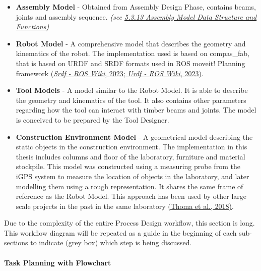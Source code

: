 \documentclass[11pt]{book}
\begin{document}
\begin{itemize}
	\item \textbf{Assembly Model} - Obtained from Assembly Design Phase, contains beams, joints and assembly sequence. \textit{\textcolor[HTML]{B7B7B7}{(see \uline{5.3.13 Assembly Model Data Structure and Functions})}}

	\item \textbf{Robot Model} - A comprehensive model that describes the geometry and kinematics of the robot. The implementation used is based on compas\_fab, that is based on URDF and SRDF formats used in ROS moveit! Planning framework \href{https://www.zotero.org/google-docs/?9FxuyJ}{(}\href{https://www.zotero.org/google-docs/?9FxuyJ}{\textit{Srdf - ROS Wiki}\href{https://www.zotero.org/google-docs/?9FxuyJ}{}, 2023; }\href{https://www.zotero.org/google-docs/?9FxuyJ}{\textit{Urdf - ROS Wiki}\href{https://www.zotero.org/google-docs/?9FxuyJ}{}, 2023)}.

	\item \textbf{Tool Models }- A model similar to the Robot Model. It is able to describe the geometry and kinematics of the tool. It also contains other parameters regarding how the tool can interact with timber beams and joints. The model is conceived to be prepared by the Tool Designer.

	\item \textbf{Construction Environment Model} - A geometrical model describing the static objects in the construction environment. The implementation in this thesis includes columns and floor of the laboratory, furniture and material stockpile. This model was constructed using a measuring probe from the iGPS system to measure the location of objects in the laboratory, and later modelling them using a rough representation. It shares the same frame of reference as the Robot Model. This approach has been used by other large scale projects in the past in the same laboratory \href{https://www.zotero.org/google-docs/?qIPEJd}{(Thoma et al., 2018)}.

\end{itemize}
Due to the complexity of the entire Process Design workflow, this section is long. This workflow diagram will be repeated as a guide in the beginning of each sub-sections to indicate (grey box) which step is being discussed.

\paragraph{Task Planning with Flowchart}
\end{document}
